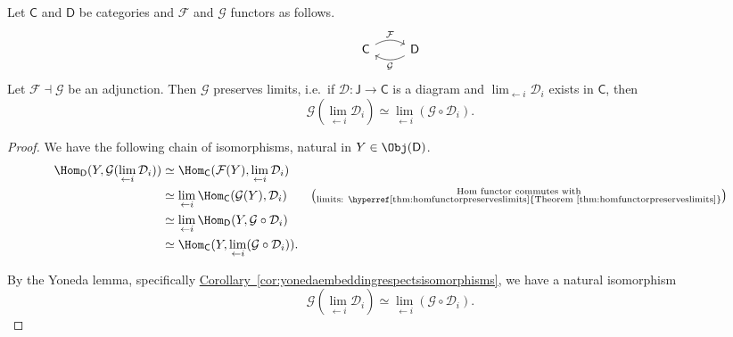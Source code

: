 \documentclass[main.tex]{subfiles}
\begin{document}
\begin{theorem}
  \label{thm:rightadjointspreservelimits}
  Let $\mathsf{C}$ and $\mathsf{D}$ be categories and $\mathcal{F}$ and $\mathcal{G}$ functors as follows.
  \begin{equation*}
    \begin{tikzcd}
      \mathsf{C}
      \arrow[r, rightarrow, bend left, "\mathcal{F}"]
      & \mathsf{D}
      \arrow[l, rightarrow, bend left, "\mathcal{G}"]
    \end{tikzcd}
  \end{equation*}
  Let $\mathcal{F} \dashv \mathcal{G}$ be an adjunction. Then $\mathcal{G}$ preserves limits, i.e.\ if $\mathcal{D}\colon \mathsf{J} \to \mathsf{C}$ is a diagram and $\lim_{\leftarrow i}\mathcal{D}_{i}$ exists in $\mathsf{C}$, then
  \begin{equation*}
    \mathcal{G}(\lim_{\leftarrow i}\mathcal{D}_{i}) \simeq \lim_{\leftarrow i} (\mathcal{G} \circ \mathcal{D}_{i}).
  \end{equation*}
\end{theorem}
\begin{proof}
  We have the following chain of isomorphisms, natural in $Y \in \Obj(\mathsf{D})$.
  \begin{align*}
    \Hom_{\mathsf{D}}(Y, \mathcal{G}(\lim_{\leftarrow i}\mathcal{D}_{i})) &\simeq \Hom_{\mathsf{C}}(\mathcal{F}(Y), \lim_{\leftarrow i}\mathcal{D}_{i}) \\
    &\simeq \lim_{\leftarrow i} \Hom_{\mathsf{C}}(\mathcal{G}(Y), \mathcal{D}_{i}) &\left(\substack{\text{Hom functor commutes with} \\ \text{limits: \hyperref[thm:homfunctorpreserveslimits]{Theorem~\ref*{thm:homfunctorpreserveslimits}}}}\right) \\
    &\simeq \lim_{\leftarrow i} \Hom_{\mathsf{D}}(Y, \mathcal{G}\circ \mathcal{D}_{i}) \\
    &\simeq \Hom_{\mathsf{C}}(Y, \lim_{\leftarrow i}(\mathcal{G}\circ \mathcal{D}_{i})).
  \end{align*}

  By the Yoneda lemma, specifically \hyperref[cor:yonedaembeddingrespectsisomorphisms]{Corollary~\ref*{cor:yonedaembeddingrespectsisomorphisms}}, we have a natural isomorphism
  \begin{equation*}
    \mathcal{G}(\lim_{\leftarrow i}\mathcal{D}_{i}) \simeq \lim_{\leftarrow i}(\mathcal{G} \circ \mathcal{D}_{i}).
  \end{equation*}
\end{proof}
\end{document}
